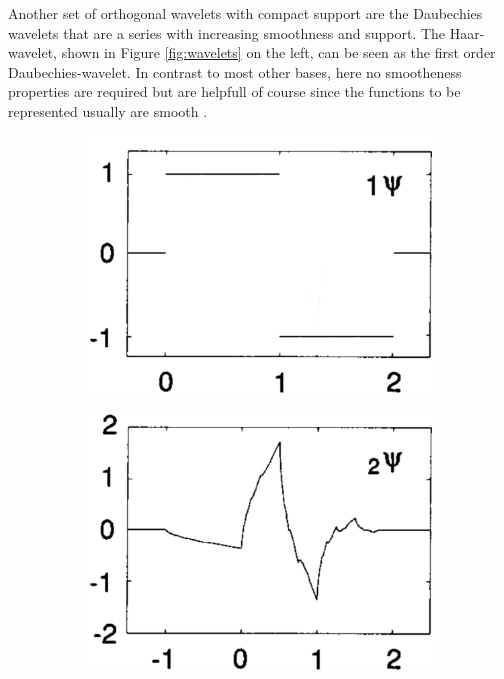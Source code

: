 Another set of orthogonal wavelets with compact support are the Daubechies wavelets that are a series with increasing smoothness and support.
The Haar-wavelet, shown in Figure \ref{fig:wavelets} on the left, can be seen as the first order Daubechies-wavelet.
In contrast to most other bases, here no smootheness properties are required but are helpfull of course since the functions to be represented usually are smooth \cite{daubechies}.
\begin{figure}
   \begin{subfigure}{0.32\textwidth}
   \includegraphics[width=\textwidth]{Figures/Daubechies1}
   \end{subfigure}
   \begin{subfigure}{0.32\textwidth}
   \includegraphics[width=\textwidth]{Figures/Daubechies2}

\end{subfigure}
\end{figure}
